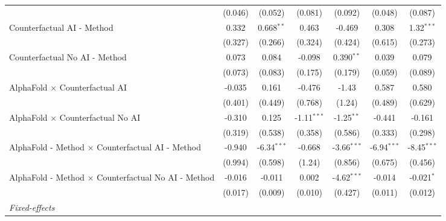 \begin{tabular}{lcccccc}
                                                              & (0.046)       & (0.052)       & (0.081)       & (0.092)       & (0.048)       & (0.087)\\   
   Counterfactual AI - Method                                 & 0.332         & 0.668$^{**}$  & 0.463         & -0.469        & 0.308         & 1.32$^{***}$\\   
                                                              & (0.327)       & (0.266)       & (0.324)       & (0.424)       & (0.615)       & (0.273)\\   
   Counterfactual No AI - Method                              & 0.073         & 0.084         & -0.098        & 0.390$^{**}$  & 0.039         & 0.079\\   
                                                              & (0.073)       & (0.083)       & (0.175)       & (0.179)       & (0.059)       & (0.089)\\   
   AlphaFold $\times$ Counterfactual AI                       & -0.035        & 0.161         & -0.476        & -1.43         & 0.587         & 0.580\\   
                                                              & (0.401)       & (0.449)       & (0.768)       & (1.24)        & (0.489)       & (0.629)\\   
   AlphaFold $\times$ Counterfactual No AI                    & -0.310        & 0.125         & -1.11$^{***}$ & -1.25$^{**}$  & -0.441        & -0.161\\   
                                                              & (0.319)       & (0.538)       & (0.358)       & (0.586)       & (0.333)       & (0.298)\\   
   AlphaFold - Method $\times$ Counterfactual AI - Method     & -0.940        & -6.34$^{***}$ & -0.668        & -3.66$^{***}$ & -6.94$^{***}$ & -8.45$^{***}$\\   
                                                              & (0.994)       & (0.598)       & (1.24)        & (0.856)       & (0.675)       & (0.456)\\   
   AlphaFold - Method $\times$ Counterfactual No AI - Method  & -0.016        & -0.011        & 0.002         & -4.62$^{***}$ & -0.014        & -0.021$^{*}$\\   
                                                              & (0.017)       & (0.009)       & (0.010)       & (0.427)       & (0.011)       & (0.012)\\   
   \midrule
   \emph{Fixed-effects}\\

\end{tabular}
